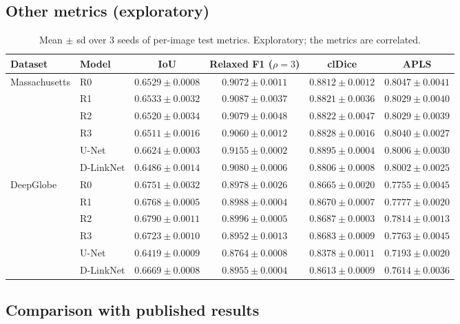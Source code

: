\documentclass[11pt]{article}
\begin{document}
\subsection{Other metrics (exploratory)}

\begin{table}[h]
\centering
\caption{Mean $\pm$ sd over 3 seeds of per-image test metrics. Exploratory; the metrics are correlated.}
\label{tab:metrics}
\small
\begin{tabular}{@{}llcccc@{}}
\toprule
Dataset & Model & IoU & Relaxed F1 ($\rho{=}3$) & clDice & APLS \\
\midrule
\multirow{6}{*}{Massachusetts}
 & R0 & $0.6529\pm0.0008$ & $0.9072\pm0.0011$ & $0.8812\pm0.0012$ & $0.8047\pm0.0041$ \\
 & R1 & $0.6533\pm0.0032$ & $0.9087\pm0.0037$ & $0.8821\pm0.0036$ & $0.8029\pm0.0040$ \\
 & R2 & $0.6520\pm0.0034$ & $0.9079\pm0.0048$ & $0.8822\pm0.0047$ & $0.8029\pm0.0039$ \\
 & R3 & $0.6511\pm0.0016$ & $0.9060\pm0.0012$ & $0.8828\pm0.0016$ & $0.8040\pm0.0027$ \\
 & U-Net & $0.6624\pm0.0003$ & $0.9155\pm0.0002$ & $0.8895\pm0.0004$ & $0.8006\pm0.0030$ \\
 & D-LinkNet & $0.6486\pm0.0014$ & $0.9080\pm0.0006$ & $0.8806\pm0.0008$ & $0.8002\pm0.0025$ \\
\midrule
\multirow{6}{*}{DeepGlobe}
 & R0 & $0.6751\pm0.0032$ & $0.8978\pm0.0026$ & $0.8665\pm0.0020$ & $0.7755\pm0.0045$ \\
 & R1 & $0.6768\pm0.0005$ & $0.8988\pm0.0004$ & $0.8670\pm0.0007$ & $0.7777\pm0.0020$ \\
 & R2 & $0.6790\pm0.0011$ & $0.8996\pm0.0005$ & $0.8687\pm0.0003$ & $0.7814\pm0.0013$ \\
 & R3 & $0.6723\pm0.0010$ & $0.8952\pm0.0013$ & $0.8683\pm0.0009$ & $0.7763\pm0.0045$ \\
 & U-Net & $0.6419\pm0.0009$ & $0.8764\pm0.0008$ & $0.8378\pm0.0011$ & $0.7193\pm0.0020$ \\
 & D-LinkNet & $0.6669\pm0.0008$ & $0.8955\pm0.0004$ & $0.8613\pm0.0009$ & $0.7614\pm0.0036$ \\
\bottomrule
\end{tabular}
\end{table}

\subsection{Comparison with published results}
\label{sec:published}
\end{document}
